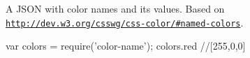 A J\+S\+ON with color names and its values. Based on \href{http://dev.w3.org/csswg/css-color/#named-colors}{\tt http\+://dev.\+w3.\+org/csswg/css-\/color/\#named-\/colors}.

\href{https://nodei.co/npm/color-name/}{\tt }


\begin{DoxyCode}
var colors = require('color-name');
colors.red //[255,0,0]
\end{DoxyCode}


\href{LICENSE}{\tt } 